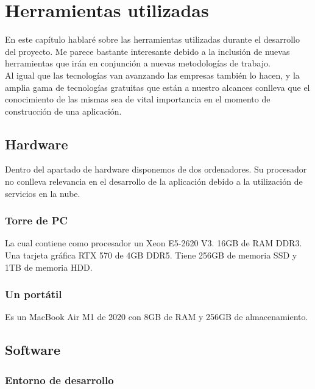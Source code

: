 \chapter{Herramientas utilizadas}

En este capítulo hablaré sobre las herramientas utilizadas durante el desarrollo del proyecto. Me parece bastante interesante debido a la inclusión de nuevas herramientas que irán en conjunción a nuevas metodologías de trabajo.
\\Al igual que las tecnologías van avanzando las empresas también lo hacen, y la amplia gama de tecnologías gratuitas que están a nuestro alcances conlleva que el conocimiento de las mismas sea de vital importancia en el momento de construcción de una aplicación.

\section{Hardware}

Dentro del apartado de hardware disponemos de dos ordenadores. Su procesador no conlleva relevancia en el desarrollo de la aplicación debido a la utilización de servicios en la nube.

\subsection{Torre de PC}

La cual contiene como procesador un Xeon E5-2620 V3. 16GB de RAM DDR3. Una tarjeta gráfica RTX 570 de 4GB DDR5. Tiene 256GB de memoria SSD y 1TB de memoria HDD.

\subsection{Un portátil}

Es un MacBook Air M1 de 2020 con 8GB de RAM y 256GB de almacenamiento.

\section{Software}

\subsection{Entorno de desarrollo}


